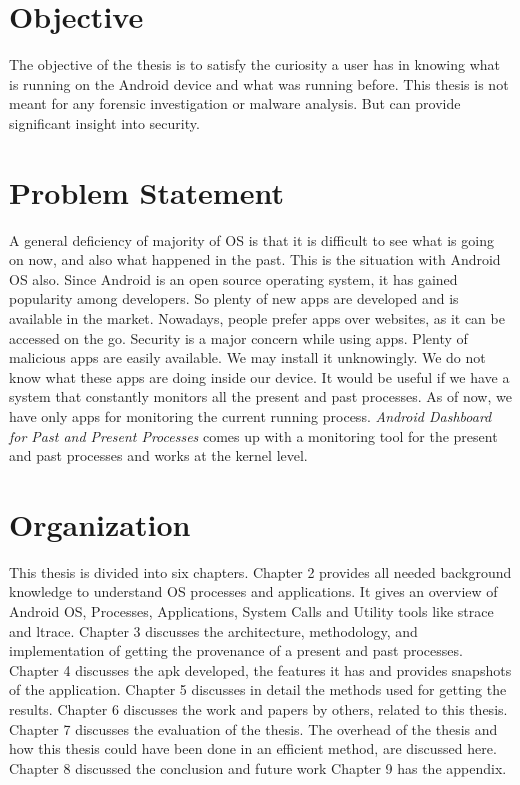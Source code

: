 \documentclass[12pt]{report}
\begin{document}
\section{Objective}
The objective of the thesis is to satisfy the curiosity a user has in knowing what is running on the Android device and what was running before. This thesis is not meant for any forensic investigation or malware analysis. But can provide significant insight into security.
	

\section{Problem Statement}A general deficiency of majority of OS is that it is difficult to see what is going on now, and also what happened in the past. This is the situation with Android OS also. Since Android is an open source operating system, it has gained popularity among developers. So plenty of new apps are developed and is available in the market. Nowadays, people prefer apps over websites, as it can be accessed on the go. Security is a major concern while using apps. Plenty of malicious apps are easily available. We may install it unknowingly. We do not know what these apps are doing inside our device. It would be useful if we have a system that constantly monitors all the present and past processes. As of now, we have only apps for monitoring the current running process. \textit{Android Dashboard for Past and Present Processes} comes up with a monitoring tool for the present and past processes and works at the kernel level.

\section{Organization}
This thesis is divided into six chapters.
\newline
Chapter 2
provides all needed background knowledge to understand OS processes and applications. It gives an
overview of Android OS, Processes, Applications, System Calls and Utility tools like strace and ltrace.
Chapter 3
discusses the architecture, methodology, and implementation of getting the provenance of a present and past processes.
Chapter 4
discusses the apk developed, the features it has and provides snapshots of the application.
Chapter 5
discusses in detail the methods used for getting the results.
Chapter 6
discusses the work and papers by others, related to this thesis.
Chapter 7
discusses the evaluation of the thesis. The overhead of the thesis and how this thesis could have been done in an efficient method, are discussed here. 
Chapter 8
discussed the conclusion and future work
Chapter 9
has the appendix.
\end{document}
